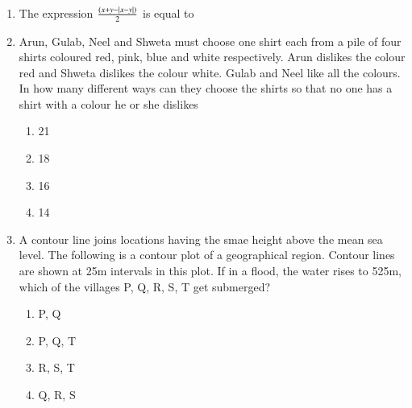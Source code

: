 \documentclass[journal,12pt,onecolumn]{IEEEtran}
\theoremstyle{remark}
\begin{document}
\begin{enumerate}
    \item The expression $\frac{\left(x+y-|x-y|\right)}{2}$ is equal to  
        \hfill{}
        \begin{enumerate}
        \end{enumerate}    
    \item Arun, Gulab, Neel and Shweta must choose one shirt each from a pile of four shirts
        coloured red, pink, blue and white respectively. Arun dislikes the colour red and Shweta dislikes
        the colour white. Gulab and Neel like all the colours. In how many different ways can they choose the
        shirts so that no one has a shirt with a colour he or she dislikes
        \hfill{}
        \begin{multicols}{4}
            \begin{enumerate}
                \item 21
                    \columnbreak
                \item 18
                    \columnbreak
                \item 16
                    \columnbreak
                \item 14
            \end{enumerate}
        \end{multicols}
    \item A contour line joins locations having the smae height above the mean sea level. The following
        is a contour plot of a geographical region. Contour lines are shown at 25m intervals in this plot.
        If in a flood, the water rises to 525m, which of the villages P, Q, R, S, T get submerged?
        \hfill{}
        \begin{multicols}{4}
            \begin{enumerate}
                \item P, Q
                    \columnbreak
                \item P, Q, T
                    \columnbreak
                \item R, S, T
                    \columnbreak
                \item Q, R, S
            \end{enumerate}
        \end{multicols}
\end{enumerate}
\end{document}
